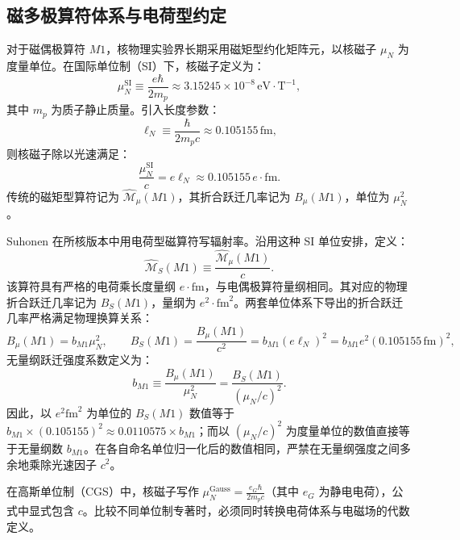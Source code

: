 \subsection{磁多极算符体系与电荷型约定}
对于磁偶极算符 $M1$，核物理实验界长期采用磁矩型约化矩阵元，以核磁子 $\mu_N$ 为度量单位。在国际单位制（SI）下，核磁子定义为：
\begin{equation}\label{eq:appA-mun-def}
\mu_N^{\mathrm{SI}} \equiv \frac{e \hbar}{2 m_p} \approx 3.15245 \times 10^{-8} \, \mathrm{eV} \cdot \mathrm{T}^{-1} ,
\end{equation}
其中 $m_p$ 为质子静止质量。引入长度参数：
\begin{equation}\label{eq:appA-ell-n-def}
\ell_N \equiv \frac{\hbar}{2 m_p c} \approx 0.105155 \, \mathrm{fm} ,
\end{equation}
则核磁子除以光速满足：
\begin{equation}\label{eq:appA-mun-over-c}
\frac{\mu_N^{\mathrm{SI}}}{c} = e \ell_N \approx 0.105155 \, e \cdot \mathrm{fm} .
\end{equation}
传统的磁矩型算符记为 $\hat{\mathcal{M}}_\mu(M1)$，其折合跃迁几率记为 $B_\mu(M1)$，单位为 $\mu_N^2$。

Suhonen 在所核版本中用电荷型磁算符写辐射率。沿用这种 SI 单位安排，定义：
\begin{equation}\label{eq:appA-ms-def}
\hat{\mathcal{M}}_S(M1) \equiv \frac{\hat{\mathcal{M}}_\mu(M1)}{c} .
\end{equation}
该算符具有严格的电荷乘长度量纲 $e\cdot\mathrm{fm}$，与电偶极算符量纲相同。其对应的物理折合跃迁几率记为 $B_S(M1)$，量纲为 $e^2\cdot\mathrm{fm}^2$。两套单位体系下导出的折合跃迁几率严格满足物理换算关系：
\begin{equation}\label{eq:appA-bs-bmu-trans}
B_\mu(M1) = b_{M1} \mu_N^2 , \qquad
B_S(M1) = \frac{B_\mu(M1)}{c^2} = b_{M1} (e \ell_N)^2 = b_{M1} e^2 (0.105155\,\mathrm{fm})^2 ,
\end{equation}
无量纲跃迁强度系数定义为：
\begin{equation}\label{eq:appA-b-m1-dimensionless}
b_{M1} \equiv \frac{B_\mu(M1)}{\mu_N^2} = \frac{B_S(M1)}{(\mu_N/c)^2} .
\end{equation}
因此，以 $e^2\mathrm{fm}^2$ 为单位的 $B_S(M1)$ 数值等于 $b_{M1} \times (0.105155)^2 \approx 0.0110575 \times b_{M1}$；而以 $(\mu_N/c)^2$ 为度量单位的数值直接等于无量纲数 $b_{M1}$。在各自命名单位归一化后的数值相同，严禁在无量纲强度之间多余地乘除光速因子 $c^2$。

在高斯单位制（CGS）中，核磁子写作 $\mu_N^{\mathrm{Gauss}} = \frac{e_G \hbar}{2 m_p c}$（其中 $e_G$ 为静电电荷），公式中显式包含 $c$。比较不同单位制专著时，必须同时转换电荷体系与电磁场的代数定义。

